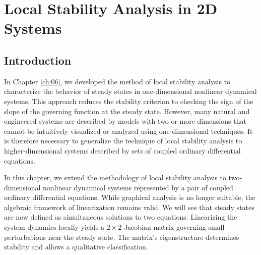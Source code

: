 \chapter{Local Stability Analysis in 2D Systems}
\label{ch:11}



\vspace{1cm}

\section{Introduction}

In Chapter \ref{ch:06}, we developed the method of local stability analysis to characterize the behavior of steady states in one-dimensional nonlinear dynamical systems. This approach reduces the stability criterion to checking the sign of the slope of the governing function at the steady state. However, many natural and engineered systems are described by models with two or more dimensions that cannot be intuitively visualized or analyzed using one-dimensional techniques. It is therefore necessary to generalize the technique of local stability analysis to higher-dimensional systems described by sets of coupled ordinary differential equations.

In this chapter, we extend the methodology of local stability analysis to two-dimensional nonlinear dynamical systems represented by a pair of coupled ordinary differential equations. While graphical analysis is no longer suitable, the algebraic framework of linearization remains valid. We will see that steady states are now defined as simultaneous solutions to two equations. Linearizing the system dynamics locally yields a $2\times 2$ Jacobian matrix governing small perturbations near the steady state. The matrix's eigenstructure determines stability and allows a qualitative classification.

